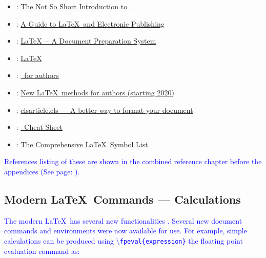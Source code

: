 \documentclass[phd]{ndsu-thesis-2022}
\newcommand\italk[1]{\textcolor{blue}{#1}}  %
\newcommand\cmd[1]{\textbackslash\texttt{#1}}  %
\begin{document}
\begin{itemize}
\setlength\itemindent{0.25in}
\item \citet{notso2021}:  \textcolor{magenta}{\href{http://tug.ctan.org/info/lshort/english/lshort.pdf}
{The Not So Short Introduction to \LaTeXe\ }}

\item \citet{kopka2004guide}:  \textcolor{magenta}{\href{https://www.math.ucdavis.edu/~tracy/courses/math129/Guide_To_LaTeX.pdf}
{A Guide to \LaTeX\ and Electronic Publishing}}

\item \citet{lamport94}: \textcolor{magenta}{\href{https://www.pearson.com/us/higher-education/program/Lamport-La-Te-X-A-Document-Preparation-System-2nd-Edition/PGM159713.html}
{\LaTeX\ -- A Document Preparation System}}

\item \citet{Wikibook2016}: \textcolor{magenta}{\href{http://upload.wikimedia.org/wikipedia/commons/2/2d/LaTeX.pdf}
{LaTeX}}

\item \citet{latxprojteam20}: \textcolor{magenta}{\href{https://www.latex-project.org/help/documentation/usrguide.pdf}
{\LaTeXe\ for authors}}

\item \citet{latxprojteam22}: \textcolor{magenta}{\href{https://www.latex-project.org/help/documentation/usrguide3.pdf}
{New \LaTeX\ methods for authors (starting 2020)}}

\item \citet{elsevier2020}: \textcolor{magenta}{\href{https://www.elsevier.com/authors/policies-and-guidelines/documents/elsdoc-1.pdf}
{elsarticle.cls --- A better way to format your document}}

\item \citet{Chang2014cheat}: \textcolor{magenta}{\href{https://wch.github.io/latexsheet/latexsheet.pdf}
{\LaTeXe\ Cheat Sheet}}

\item \citet{pakin2021comp}: \textcolor{magenta}{\href{https://tug.ctan.org/info/symbols/comprehensive/symbols-a4.pdf}
{The Comprehensive \LaTeX\ Symbol List}}
\end{itemize}

\italk{References listing of these are shown in the combined reference chapter before the appendices (See page: \pageref{biblio}).}

\subsection{Modern \LaTeX\ Commands --- Calculations}
\italk{The modern \LaTeX\ has several new functionalities \citep{latxprojteam22}. Several new document commands and environments were now available for use.  For example, simple calculations can be produced using \cmd{fpeval\{expression\}} the floating point evaluation command as:}
\end{document}
